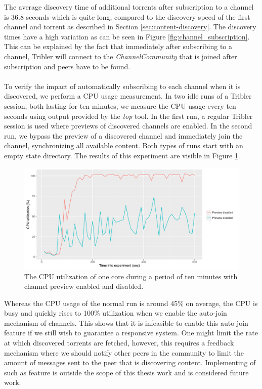 The average discovery time of additional torrents after subscription to a channel is 36.8 seconds which is quite long, compared to the discovery speed of the first channel and torrent as described in Section \ref{sec:content-discovery}. The discovery times have a high variation as can be seen in Figure \ref{fig:channel_subscription}. This can be explained by the fact that immediately after subscribing to a channel, Tribler will connect to the \emph{ChannelCommunity} that is joined after subscription and peers have to be found.\\\\
To verify the impact of automatically subscribing to each channel when it is discovered, we perform a CPU usage measurement. In two idle runs of a Tribler session, both lasting for ten minutes, we measure the CPU usage every ten seconds using output provided by the \emph{top} tool. In the first run, a regular Tribler session is used where previews of discovered channels are enabled. In the second run, we bypass the preview of a discovered channel and immediately join the channel, synchronizing all available content. Both types of runs start with an empty state directory. The results of this experiment are visible in Figure \ref{fig:channel_subscription_cpu}.

\begin{figure}[!h]
	\centering
	\includegraphics[width=1.0\columnwidth]{images/experiments/subscribe_cpu_experiment}
	\caption{The CPU utilization of one core during a period of ten minutes with channel preview enabled and disabled.}
	\label{fig:channel_subscription_cpu}
\end{figure}

Whereas the CPU usage of the normal run is around 45\% on average, the CPU is busy and quickly rises to 100\% utilization when we enable the auto-join mechanism of channels. This shows that it is infeasible to enable this auto-join feature if we still wish to guarantee a responsive system. One might limit the rate at which discovered torrents are fetched, however, this requires a feedback mechanism where we should notify other peers in the community to limit the amount of messages sent to the peer that is discovering content. Implementing of such as feature is outside the scope of this thesis work and is considered future work.


